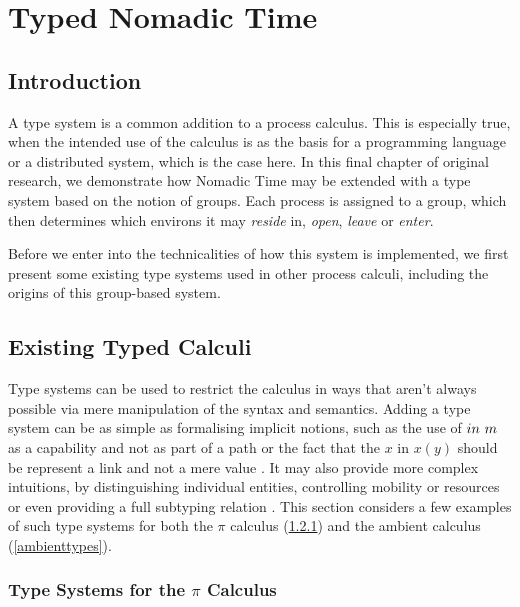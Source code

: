 
\chapter{Typed Nomadic Time}
\label{tnt}

\section{Introduction}

A type system is a common addition to a process calculus.  This is
especially true, when the intended use of the calculus is as the basis
for a programming language or a distributed system, which is the case
here.  In this final chapter of original research, we demonstrate how
Nomadic Time may be extended with a type system based on the notion of
groups.  Each process is assigned to a group, which then determines
which environs it may \emph{reside} in, \emph{open}, \emph{leave} or
\emph{enter}.

Before we enter into the technicalities of how this system is
implemented, we first present some existing type systems used in other
process calculi, including the origins of this group-based system.

\section{Existing Typed Calculi}
\label{typedcalculi}

Type systems can be used to restrict the calculus in ways that aren't
always possible via mere manipulation of the syntax and semantics.
Adding a type system can be as simple as formalising implicit notions,
such as the use of $in\ m$ as a capability and not as part of a
path \cite{ambienttypes} or the fact that the $x$ in $x(y)$ should be
represent a link and not a mere value \cite{sangiorgi:types-or}.  It
may also provide more complex intuitions, by distinguishing individual
entities, controlling mobility \cite{sangiorgi:mobsafeambients,
  ambienttypes} or resources \cite{hennessy:dpi98} or even providing a
full subtyping relation \cite{sangiorgi:typing, boxedamb02}.  This
section considers a few examples of such type systems for both the
$\pi$ calculus (\ref{pitypes}) and the ambient calculus
(\ref{ambienttypes}).

\subsection{Type Systems for the $\pi$ Calculus}
\label{pitypes}

